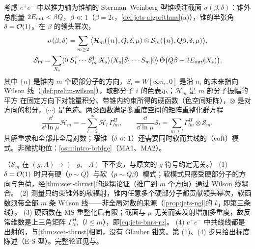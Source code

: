 \begin{theorem}\label{thm:jets-ngl-factorization}
考虑 $e^+e^-$ 中以推力轴为锥轴的 Sterman--Weinberg 型锥喷注截面 $\sigma(\beta,\delta)$：锥外总能量 $2E_{\rm out}<\beta Q$，$\beta\ll1$（$\beta=2\epsilon$，\cref{def:jets-algorithms}(a)），锥的半张角 $\delta=\mathcal{O}\!\left(1\right)$。在 $\beta$ 的领头幂次，
\begin{equation}\label{eq:jets-bnrs}
\begin{gathered}
\sigma(\beta,\delta)=\sum_{m\ge2}\big\langle\mathcal H_m(\{n\},Q,\delta,\mu)\otimes\mathcal S_m(\{n\},Q\beta,\delta,\mu)\big\rangle,\\
\mathcal S_m=\sum_{X_s}\langle0|S_1^\dagger\cdots S_m^\dagger|X_s\rangle\langle X_s|S_1\cdots S_m|0\rangle\,\Theta\big(Q\beta-2E_{\rm out}(X_s)\big),
\end{gathered}
\end{equation}
其中 $\{n\}$ 是锥内 $m$ 个硬部分子的方向，$S_i=W[\infty n_i,0]$ 是沿 $n_i$ 的未来指向 Wilson 线（\cref{def:prelim-wilson}），取部分子 $i$ 的色表示；$\mathcal H_m$ 是 $m$ 部分子振幅的平方
在固定方向下对能量积分、带锥内约束所得的硬函数（色空间矩阵），$\otimes$ 是对方向的积分，$\langle\cdots\rangle$ 是色迹。两类函数满足多重度空间的矩阵重整化群方程
\begin{equation}\label{eq:jets-bnrs-rg}
\frac{\dd}{\dd\ln\mu}\mathcal H_m=-\sum_{l=2}^{m}\mathcal H_l\,\Gamma^H_{lm},\qquad
\frac{\dd}{\dd\ln\mu}\mathcal S_l=\sum_{m\ge l}\Gamma^H_{lm}\otimes\mathcal S_m ,
\end{equation}
其解重求和全部非全局对数；窄锥（$\delta\ll1$）还需要同时软而共线的（coft）模式。非微扰地位：\cref{asm:intro-bridge}（MA1、MA2）。
\end{theorem}

\begin{proofsketch}
（$\mathcal S_m$ 在 $(g,A)\to(-g,-A)$ 下不变，与原文\cite{Becher:2016mmh}的 $g$ 符号约定无关。）
(1) $\delta=\mathcal{O}\!\left(1\right)$ 时只有硬（$p\sim Q$）与软（$p\sim Q\beta$）模式；软模式只感受硬部分子的方向与色荷，经\cref{thm:scet-thrust}的退耦论证（推广到 $m$ 个方向）通过 Wilson 线耦合。
(2) 测量只约束锥外的软辐射，锥内任意多个硬部分子都贡献领头幂次，软函数须带全部 $m$ 条 Wilson 线——非全局对数的来源（\cref{prop:jets-ngl}的 $k_1$ 即第三条线）。
(3) 硬函数在 $\overline{\mathrm{MS}}$ 重整化后有限；截面与 $\mu$ 无关而实发射增加多重度，故反常维数是上三角矩阵 $\Gamma^H_{lm}$（$l\le m$），即\cref{eq:jets-bnrs-rg}。
(4) $e^+e^-$ 中共线线都是出射的，与\cref{thm:scet-thrust}相同，没有 Glauber 钳夹。第 (1)、(4) 步只给出标度陈述（E-S 型）。完整论证见\cite[第~2~节]{Becher:2016mmh}与\cite{Becher:2015hka}。
\end{proofsketch}

